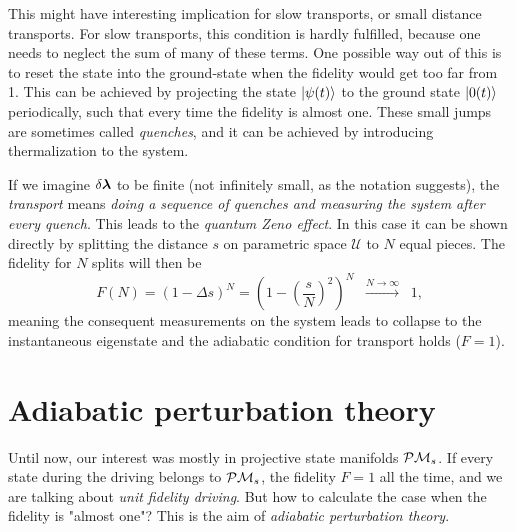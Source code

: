 This might have interesting implication for slow transports, or small distance transports. For slow transports, this condition is hardly fulfilled, because one needs to neglect the sum of many of these terms. One possible way out of this is to reset the state into the ground-state when the fidelity would get too far from 1. This can be achieved by projecting the state $\ket{\psi(t)}$ to the ground state $\ket{0(t)}$ periodically, such that every time the fidelity is almost one. These small jumps are sometimes called \emph{quenches}, and it can be achieved by introducing thermalization to the system.






If we imagine $\delta{\bm\lambda}$ to be finite (not infinitely small, as the notation suggests), the \emph{transport} means \emph{doing a sequence of quenches and measuring the system after every quench}. This leads to the \emph{quantum Zeno effect}. In this case it can be shown directly by splitting the distance $s$ on parametric space $\mathcal U$ to $N$ equal pieces. The fidelity for $N$ splits will then be
\begin{equation}
    F(N)=(1-\Delta s)^N=\left(1-\left(\frac{s}{N}\right)^2\right)^N \;\;\overset{N\rightarrow\infty}{\longrightarrow}\;\; 1,
\end{equation}
meaning the consequent measurements on the system leads to collapse to the instantaneous eigenstate and the adiabatic condition for transport holds ($F=1$). 













\section{Adiabatic perturbation theory}
Until now, our interest was mostly in projective state manifolds $\mathcal{P}\mathcal{M}_s$. If every state during the driving belongs to $\mathcal{P}\mathcal{M}_s$, the fidelity $F=1$ all the time, and we are talking about \emph{unit fidelity driving}. But how to calculate the case when the fidelity is "almost one"? This is the aim of \emph{adiabatic perturbation theory}.


